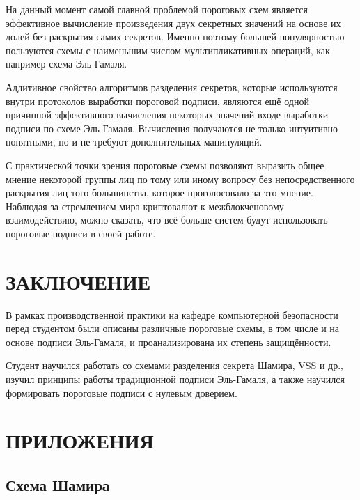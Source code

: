\documentclass[a4paper,12pt]{article}
\theoremstyle{definition}
\begin{document}
	На данный момент самой главной проблемой пороговых схем является эффективное вычисление произведения двух секретных значений на основе их долей без раскрытия самих секретов. Именно поэтому большей популярностью пользуются схемы с наименьшим числом мультипликативных операций, как например схема Эль-Гамаля.
	
	Аддитивное свойство алгоритмов разделения секретов, которые используются внутри протоколов выработки пороговой подписи, являются ещё одной причинной эффективного вычисления некоторых значений входе выработки подписи по схеме Эль-Гамаля. Вычисления получаются не только интуитивно понятными, но и не требуют дополнительных манипуляций.
	
	С практической точки зрения пороговые схемы позволяют выразить общее мнение некоторой группы лиц по тому или иному вопросу без непосредственного раскрытия лиц того большинства, которое проголосовало за это мнение. Наблюдая за стремлением мира криптовалют к межблокченовому взаимодействию, можно сказать, что всё больше систем будут использовать пороговые подписи в своей работе.
	
	
	\newpage
	\section*{ЗАКЛЮЧЕНИЕ}
	
	В рамках производственной практики на кафедре компьютерной безопасности перед студентом были описаны различные пороговые схемы, в том числе и на основе подписи Эль-Гамаля, и проанализирована их степень защищённости.
	
	Студент научился работать со схемами разделения секрета Шамира, VSS и др., изучил принципы работы традиционной подписи Эль-Гамаля, а также научился формировать пороговые подписи с нулевым доверием. 
	
	
	
	\newpage
	\printbibliography[title={БИБЛИОГРАФИЧЕСКИЙ СПИСОК}]
	
	\newpage
	\section*{ПРИЛОЖЕНИЯ}
	
	\setcounter{subsection}{0}
	\renewcommand\thesubsection{\Alph{subsection}}

		\subsection{Схема Шамира} \label{applic:Shamir}
		
\end{document}
